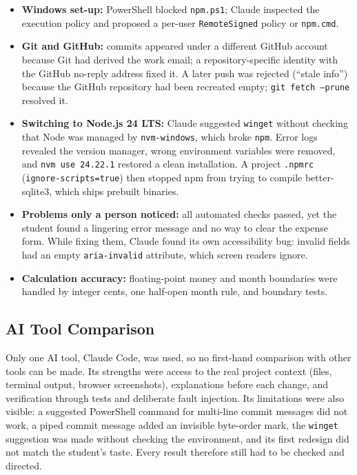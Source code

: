 \documentclass[11pt,a4paper]{article}
\begin{document}
\begin{itemize}
    \item \textbf{Windows set-up:} PowerShell blocked \texttt{npm.ps1};
    Claude inspected the execution policy and proposed a per-user
    \texttt{RemoteSigned} policy or \texttt{npm.cmd}.
    \item \textbf{Git and GitHub:} commits appeared under a different
    GitHub account because Git had derived the work email; a
    repository-specific identity with the GitHub no-reply address fixed
    it. A later push was rejected (``stale info'') because the GitHub
    repository had been recreated empty; \texttt{git fetch --prune}
    resolved it.
    \item \textbf{Switching to Node.js 24 LTS:} Claude suggested
    \texttt{winget} without checking that Node was managed by
    \texttt{nvm-windows}, which broke \texttt{npm}. Error logs revealed
    the version manager, wrong environment variables were removed, and
    \texttt{nvm use 24.22.1} restored a clean installation. A project
    \texttt{.npmrc} (\texttt{ignore-scripts=true}) then stopped npm from
    trying to compile better-sqlite3, which ships prebuilt binaries.
    \item \textbf{Problems only a person noticed:} all automated checks
    passed, yet the student found a lingering error message and no way to
    clear the expense form. While fixing them, Claude found its own
    accessibility bug: invalid fields had an empty \texttt{aria-invalid}
    attribute, which screen readers ignore.
    \item \textbf{Calculation accuracy:} floating-point money and month
    boundaries were handled by integer cents, one half-open month rule,
    and boundary tests.
\end{itemize}

\subsection{AI Tool Comparison}

Only one AI tool, Claude Code, was used, so no first-hand comparison with
other tools can be made. Its strengths were access to the real project
context (files, terminal output, browser screenshots), explanations
before each change, and verification through tests and deliberate fault
injection. Its limitations were also visible: a suggested PowerShell
command for multi-line commit messages did not work, a piped commit
message added an invisible byte-order mark, the \texttt{winget}
suggestion was made without checking the environment, and its first
redesign did not match the student's taste. Every result therefore still
had to be checked and directed.
\end{document}
